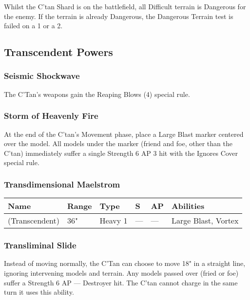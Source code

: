 Whilst the C'tan Shard is on the battlefield, all Difficult terrain is Dangerous for the enemy. If the terrain is already Dangerous, the Dangerous Terrain test is failed on a 1 or a 2.


\subsection{Transcendent Powers}

\subsubsection{Seismic Shockwave} \label{Seismic Shockwave}

The C'Tan's weapons gain the Reaping Blows (4) special rule.

\subsubsection{Storm of Heavenly Fire} \label{Storm of Heavenly Fire}

At the end of the C'tan's Movement phase, place a Large Blast marker centered over the model. All models under the marker (friend and foe, other than the C'tan) immediately suffer a single Strength 6 AP 3 hit with the Ignores Cover special rule.

\subsubsection{Transdimensional Maelstrom} \label{Transdimensional Maelstrom}

\noindent
\begin{tabular}{||m{160pt} m{31pt} m{55pt} m{12pt} m{12pt} m{200pt}||}
	\hline
	Name & Range & Type & S & AP & Abilities \\
	\hline
	\quickref{Transdimensional Maelstrom} (Transcendent) & 36" & Heavy 1 & — & — & Large Blast, Vortex \\
	\hline
\end{tabular}

\subsubsection{Transliminal Slide} \label{Transliminal Slide}

Instead of moving normally, the C'Tan can choose to move 18" in a straight line, ignoring intervening models and terrain. Any models passed over (fried or foe) suffer a Strength 6 AP — Destroyer hit. The C'tan cannot charge in the same turn it uses this ability.

